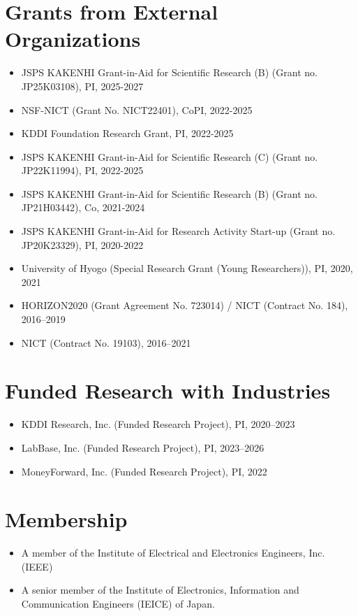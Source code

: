 \section*{Grants from External Organizations}
\begin{itemize}
  \item JSPS KAKENHI Grant-in-Aid for Scientific Research (B) (Grant no. JP25K03108), PI, 2025-2027
  \item NSF-NICT (Grant No. NICT22401), CoPI, 2022-2025
  \item KDDI Foundation Research Grant, PI, 2022-2025
  \item JSPS KAKENHI Grant-in-Aid for Scientific Research (C) (Grant no. JP22K11994), PI, 2022-2025
  \item JSPS KAKENHI Grant-in-Aid for Scientific Research (B) (Grant no. JP21H03442), Co, 2021-2024
  \item JSPS KAKENHI Grant-in-Aid for Research Activity Start-up (Grant no. JP20K23329), PI, 2020-2022
  \item University of Hyogo (Special Research Grant (Young Researchers)), PI, 2020, 2021
  \item HORIZON2020 (Grant Agreement No. 723014) / NICT (Contract No. 184), 2016--2019
  \item NICT (Contract No. 19103), 2016--2021
\end{itemize}

\section*{Funded Research with Industries}
\begin{itemize}
  \item KDDI Research, Inc. (Funded Research Project), PI, 2020--2023
  \item LabBase, Inc. (Funded Research Project), PI, 2023--2026
  \item MoneyForward, Inc. (Funded Research Project), PI, 2022
\end{itemize}

\section*{Membership}
\begin{itemize}
  \item A member of the Institute of Electrical and Electronics Engineers, Inc. (IEEE)
  \item A senior member of the Institute of Electronics, Information and Communication Engineers
    (IEICE) of Japan.
\end{itemize}

